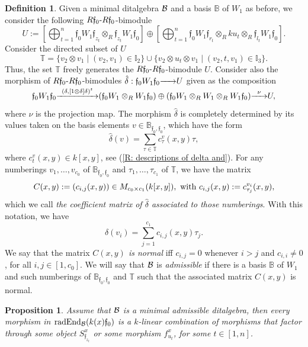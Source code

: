 \documentclass{article}
\newtheorem{proposition}[theorem]{Proposition}
\theoremstyle{definition}
\newtheorem{definition}[theorem]{Definition}
\newcommand{\End}{{ \rm End }}
\newcommand{\rad}{{ \rm rad }}
\renewcommand{\frak}{\mathfrak}
\newcommand{\g}{\hbox{-}}
\newcommand{\hueca}[1]{\mathbb{#1}}
\newcommand{\rightmap}[1]{\smash{\mathop{\hbox to 
20pt{\rightarrowfill}}\limits^{#1}}}
\begin{document}
\begin{definition}\label{D: hat(delta) y admis} Given a minimal ditalgebra  ${\cal B}$ and a basis $\hueca{B}$ of $W_1$ as before, we consider the following $R\frak{f}_0\g R\frak{f}_0$-bimodule
$$U:=
\left[\bigoplus_{t=1}^n
\frak{f}_0W_1\frak{f}_{z_t}
\otimes_R\frak{f}_{z_t}W_1\frak{f}_0\right]
\oplus\left[\bigoplus_{t=1}^n
\frak{f}_0W_1\frak{f}_{r_t}\otimes_Rku_t\otimes_R\frak{f}_{l_t}W_1\frak{f}_0\right].$$
Consider the directed subset of $U$  
 $$\hueca{T}=\{v_2\otimes v_1\mid (v_2,v_1)\in \hueca{I}_2\} \cup \{v_2\otimes u_t\otimes v_1\mid (v_2,t,v_1) \in \hueca{I}_3\}.$$
 Thus, the set $\hueca{T}$ freely generates the $R\frak{f}_0\g R\frak{f}_0$-bimodule $U$. 
 Consider also the morphism of $R\frak{f}_0\g R\frak{f}_0$-bimodules $\hat{\delta}:\frak{f}_0W_1\frak{f}_0\rightmap{}U$ given as the composition
 $$\frak{f}_0W_1\frak{f}_0\rightmap{ \ \  (\delta,[1\otimes\delta]\delta)^t \ \ }(\frak{f}_0W_1\otimes_RW_1\frak{f}_0)\oplus 
 (\frak{f}_0W_1\otimes_RW_1\otimes_RW_1\frak{f}_0)
 \rightmap{\nu}U,$$
 where $\nu$ is the projection map. The  morphism $\hat{\delta}$ is completely determined by its values taken on the  basis  elements $v\in \hueca{B}_{\frak{f}_0,\frak{f}_0}$, which have the form 
 $$\hat{\delta}(v)=\sum_{\tau\in \hueca{T}}c_\tau^v(x,y)\tau,$$
 where $c_t^v(x,y)\in k[x,y]$, see (\ref{R: descriptions of delta and}).  
 For any numberings $v_1,\ldots,v_{c_0}$ of $\hueca{B}_{\frak{f}_0,\frak{f}_0}$ and $\tau_1,\ldots, \tau_{c_1}$ of $\hueca{T}$, we have the matrix
 $$C(x,y):=(c_{i,j}(x,y))\in M_{c_0\times c_1}(k[x,y]), \hbox{ with } c_{i,j}(x,y):=c^{v_i}_{\tau_j}(x,y),$$
 which we call \emph{the coefficient matrix of $\hat{\delta}$ associated to those numberings}. With this notation, we have 
 $$\hat{\delta}(v_i)=\sum_{j=1}^{c_1}c_{i,j}(x,y)\tau_j.$$
 We say that the matrix \emph{$C(x,y)$ is normal} iff $c_{i,j}=0$ whenever $i>j$ and $c_{i,i}\not=0$, for all $i,j\in [1,c_0]$.  
 We will say that ${\cal B}$ is \emph{admissible} if there is a basis $\hueca{B}$ of $W_1$ and such numberings of $\hueca{B}_{\frak{f}_0,\frak{f}_0}$ and $\hueca{T}$ such that the associated matrix $C(x,y)$ is  normal.   
\end{definition}

\begin{proposition}\label{P: C normal --> rad(k(x)f0) se factorizan bien} Assume that ${\cal B}$ is a minimal admissible ditalgebra,  then every morphism in 
$\rad \End_{\cal B}(k(x)\frak{f}_0)$ is a $k$-linear combination of morphisms that  factor through some object $S^x_{\frak{f}_{z_t}}$ or  some morphism $f^x_{u_t}$, for some $t\in [1,n]$. 
\end{proposition}
\end{document}
